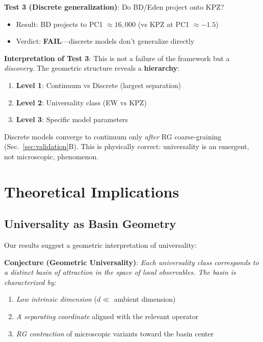 \documentclass[aps,pre,twocolumn,superscriptaddress,showpacs,longbibliography]{revtex4-2}
\begin{document}
\textbf{Test 3 (Discrete generalization)}: Do BD/Eden project onto KPZ?
\begin{itemize}
\item Result: BD projects to PC1 $\approx 16,000$ (vs KPZ at PC1 $\approx -1.5$)
\item Verdict: \textbf{FAIL}---discrete models don't generalize directly
\end{itemize}

\textbf{Interpretation of Test 3}: This is not a failure of the framework but a \emph{discovery}. The geometric structure reveals a \textbf{hierarchy}:
\begin{enumerate}
\item \textbf{Level 1}: Continuum vs Discrete (largest separation)
\item \textbf{Level 2}: Universality class (EW vs KPZ)
\item \textbf{Level 3}: Specific model parameters
\end{enumerate}

Discrete models converge to continuum only \emph{after} RG coarse-graining (Sec.~\ref{sec:validation}B). This is physically correct: universality is an emergent, not microscopic, phenomenon.

\section{Theoretical Implications}
\label{sec:implications}

\subsection{Universality as Basin Geometry}

Our results suggest a geometric interpretation of universality:

\textbf{Conjecture (Geometric Universality)}: \emph{Each universality class corresponds to a distinct basin of attraction in the space of local observables. The basin is characterized by:}
\begin{enumerate}
\item \emph{Low intrinsic dimension} ($d \ll$ ambient dimension)
\item \emph{A separating coordinate} aligned with the relevant operator
\item \emph{RG contraction} of microscopic variants toward the basin center
\end{enumerate}
\end{document}
